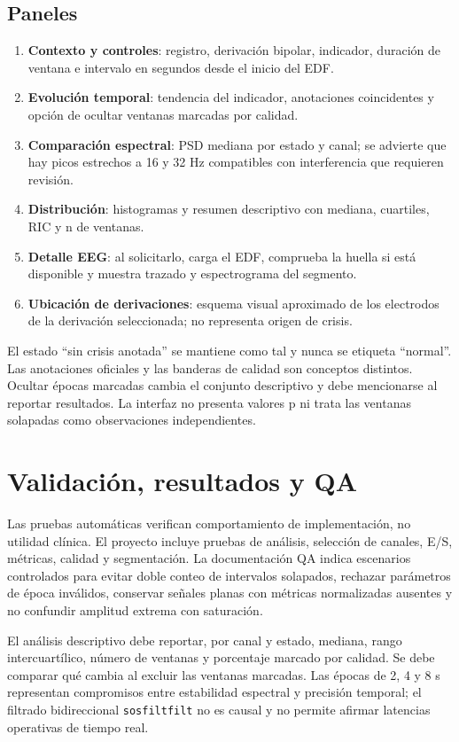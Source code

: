 \documentclass[11pt,a4paper]{article}
\begin{document}
\subsection{Paneles}
\begin{enumerate}[leftmargin=*]
\item \textbf{Contexto y controles}: registro, derivación bipolar, indicador, duración de ventana e intervalo en segundos desde el inicio del EDF.
\item \textbf{Evolución temporal}: tendencia del indicador, anotaciones coincidentes y opción de ocultar ventanas marcadas por calidad.
\item \textbf{Comparación espectral}: PSD mediana por estado y canal; se advierte que hay picos estrechos a 16 y 32 Hz compatibles con interferencia que requieren revisión.
\item \textbf{Distribución}: histogramas y resumen descriptivo con mediana, cuartiles, RIC y n de ventanas.
\item \textbf{Detalle EEG}: al solicitarlo, carga el EDF, comprueba la huella si está disponible y muestra trazado y espectrograma del segmento.
\item \textbf{Ubicación de derivaciones}: esquema visual aproximado de los electrodos de la derivación seleccionada; no representa origen de crisis.
\end{enumerate}

El estado “sin crisis anotada” se mantiene como tal y nunca se etiqueta “normal”. Las anotaciones oficiales y las banderas de calidad son conceptos distintos. Ocultar épocas marcadas cambia el conjunto descriptivo y debe mencionarse al reportar resultados. La interfaz no presenta valores p ni trata las ventanas solapadas como observaciones independientes.

\section{Validación, resultados y QA}
Las pruebas automáticas verifican comportamiento de implementación, no utilidad clínica. El proyecto incluye pruebas de análisis, selección de canales, E/S, métricas, calidad y segmentación. La documentación QA indica escenarios controlados para evitar doble conteo de intervalos solapados, rechazar parámetros de época inválidos, conservar señales planas con métricas normalizadas ausentes y no confundir amplitud extrema con saturación.

El análisis descriptivo debe reportar, por canal y estado, mediana, rango intercuartílico, número de ventanas y porcentaje marcado por calidad. Se debe comparar qué cambia al excluir las ventanas marcadas. Las épocas de 2, 4 y 8 s representan compromisos entre estabilidad espectral y precisión temporal; el filtrado bidireccional \texttt{sosfiltfilt} no es causal y no permite afirmar latencias operativas de tiempo real.
\end{document}
